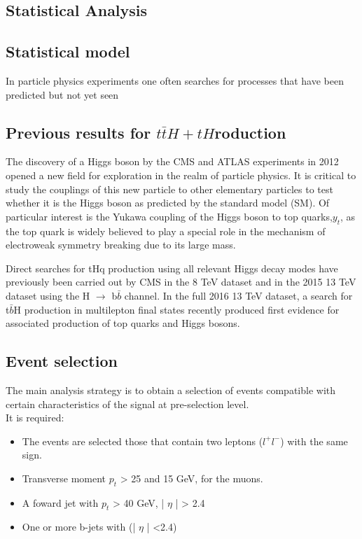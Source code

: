 \begin{linenumbers}
\chapter{Statistical Analysis}

\section{Statistical model}
In particle physics experiments one often searches for processes that have been predicted
but not yet seen


\section{Previous results for  \texorpdfstring{${t\bar{t}H+tH}$}  production}
The discovery of a Higgs boson by the CMS and ATLAS experiments in 2012 opened a new field for exploration in the realm of particle physics. It is critical to study the couplings of
this new particle to other elementary particles to test whether it is the Higgs boson as predicted
by the standard model (SM). Of particular interest is the Yukawa coupling of the Higgs boson
to top quarks,$y_t$, as the top quark is widely believed to play a special role in the mechanism
of electroweak symmetry breaking due to its large mass.

Direct searches for tHq production using all relevant Higgs decay modes have previously been
carried out by CMS in the 8 TeV dataset  and in the 2015 13 TeV dataset using the H $\rightarrow$
b$\bar{b}$ channel. In the full 2016 13 TeV dataset, a search for t$\bar{b}$H production in multilepton
final states recently produced first evidence for associated production of top quarks and Higgs
bosons.

\section{Event selection}
The main analysis strategy is to obtain a selection of events compatible with certain characteristics of the signal at pre-selection level.\\
It is required:
\begin{itemize}
\item The events are selected those that contain two leptons ($l^+l^-$)  with the same sign.
\item Transverse moment $p_{t}$ > 25 and 15 GeV, for the muons.
\item A foward jet with $p_t$ > 40 GeV, | $\eta$ | > 2.4
\item One or more b-jets with (| $\eta$ | <2.4)
\end{itemize}




\end{linenumbers}
